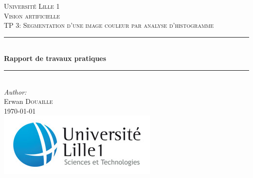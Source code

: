 \makeatletter

\begin{titlepage}

\newcommand{\HRule}{\rule{\linewidth}{0.5mm}} %

\center %
 

\textsc{\LARGE Université Lille 1}\\[1.5cm] %
\vspace{7em}
\textsc{\Large Vision artificielle}\\[0.5cm] %
\textsc{\large TP 3: Segmentation d'une image couleur par analyse d'histogramme}\\[0.5cm] %


\vspace{1em}
\HRule \\[0.4cm]
{ \huge \bfseries Rapport de travaux pratiques}\\[0.1cm] %
\HRule \\[2cm]
 

\Large \emph{Author:}\\
Erwan \textsc{Douaille}\\[1cm] %


{\large \today}\\[3cm] %


\includegraphics[scale=0.6]{image/ustl1.jpg}
 

\vfill %

\end{titlepage}
\makeatother

\sloppy